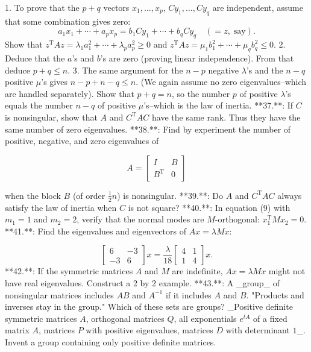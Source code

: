 1. To prove that the \(p+q\) vectors \(x_{1},\ldots,x_{p}\), \(Cy_{1},\ldots,Cy_{q}\) are independent, assume that some combination gives zero: \[a_{1}x_{1}+\cdots+a_{p}x_{p}=b_{1}Cy_{1}+\cdots+b_{q}Cy_{q}\quad(=z,\;\text{say}).\] Show that \(z^{\text{T}}Az=\lambda_{1}a_{1}^{2}+\cdots+\lambda_{p}a_{p}^{2}\geq 0\) and \(z^{\text{T}}Az=\mu_{1}b_{1}^{2}+\cdots+\mu_{q}b_{q}^{2}\leq 0\). 2. Deduce that the \(a\)'s and \(b\)'s are zero (proving linear independence). From that deduce \(p+q\leq n\). 3. The same argument for the \(n-p\) negative \(\lambda\)'s and the \(n-q\) positive \(\mu\)'s gives \(n-p+n-q\leq n\). (We again assume no zero eigenvalues--which are handled separately). Show that \(p+q=n\), so the number \(p\) of positive \(\lambda\)'s equals the number \(n-q\) of positive \(\mu\)'s--which is the law of inertia.
**37.**: If \(C\) is nonsingular, show that \(A\) and \(C^{\text{T}}AC\) have the same rank. Thus they have the same number of zero eigenvalues.
**38.**: Find by experiment the number of positive, negative, and zero eigenvalues of

\[A=\begin{bmatrix}I&B\\ B^{\text{T}}&0\end{bmatrix}\]

when the block \(B\) (of order \(\frac{1}{2}n\)) is nonsingular.
**39.**: Do \(A\) and \(C^{\text{T}}AC\) always satisfy the law of inertia when \(C\) is not square?
**40.**: In equation (9) with \(m_{1}=1\) and \(m_{2}=2\), verify that the normal modes are \(M\)-orthogonal: \(x_{1}^{\text{T}}Mx_{2}=0\).
**41.**: Find the eigenvalues and eigenvectors of \(Ax=\lambda Mx\):

\[\begin{bmatrix}6&-3\\ -3&6\end{bmatrix}x=\frac{\lambda}{18}\begin{bmatrix}4&1\\ 1&4\end{bmatrix}x.\]
**42.**: If the symmetric matrices \(A\) and \(M\) are indefinite, \(Ax=\lambda Mx\) might not have real eigenvalues. Construct a 2 by 2 example.
**43.**: A _group_ of nonsingular matrices includes \(AB\) and \(A^{-1}\) if it includes \(A\) and \(B\). "Products and inverses stay in the group." Which of these sets are groups? _Positive definite symmetric matrices \(A\), orthogonal matrices \(Q\), all exponentials \(e^{tA}\) of a fixed matrix \(A\), matrices \(P\) with positive eigenvalues, matrices \(D\) with determinant \(1\)_. Invent a group containing only positive definite matrices.

 